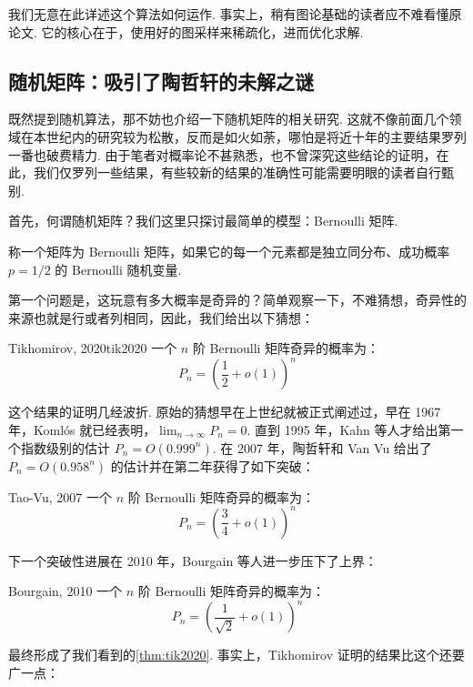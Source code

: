 我们无意在此详述这个算法如何运作. 事实上，稍有图论基础的读者应不难看懂原论文. 它的核心在于，使用好的图采样来稀疏化，进而优化求解.

\subsection{随机矩阵：吸引了陶哲轩的未解之谜}

既然提到随机算法，那不妨也介绍一下随机矩阵的相关研究. 这就不像前面几个领域在本世纪内的研究较为松散，反而是如火如荼，哪怕是将近十年的主要结果罗列一番也破费精力. 由于笔者对概率论不甚熟悉，也不曾深究这些结论的证明，在此，我们仅罗列一些结果，有些较新的结果的准确性可能需要明眼的读者自行甄别.

首先，何谓随机矩阵？我们这里只探讨最简单的模型：Bernoulli 矩阵.

\begin{definition}{}{}
    称一个矩阵为 Bernoulli 矩阵，如果它的每一个元素都是独立同分布、成功概率 $p = 1/2$ 的 Bernoulli 随机变量.
\end{definition}

第一个问题是，这玩意有多大概率是奇异的？简单观察一下，不难猜想，奇异性的来源也就是行或者列相同，因此，我们给出以下猜想：

\begin{theorem}{Tikhomirov, 2020}{tik2020}
    一个 $n$ 阶 Bernoulli 矩阵奇异的概率为：
    \[ P_n = \left( \frac{1}{2} + o(1) \right)^n \]
\end{theorem}

这个结果的证明几经波折. 原始的猜想早在上世纪就被正式阐述过，早在 1967 年，Koml\'os 就已经表明，$\displaystyle\lim_{n \to \infty} P_n = 0$. 直到 1995 年，Kahn 等人才给出第一个指数级别的估计 $P_n = O(0.999^n)$. 在 2007 年，陶哲轩和 Van Vu 给出了 $P_n = O(0.958^n)$ 的估计并在第二年获得了如下突破：

\begin{theorem}{Tao-Vu, 2007}{}
    一个 $n$ 阶 Bernoulli 矩阵奇异的概率为：
    \[ P_n = \left( \frac{3}{4} + o(1) \right)^n \]
\end{theorem}

下一个突破性进展在 2010 年，Bourgain 等人进一步压下了上界：

\begin{theorem}{Bourgain, 2010}{}
    一个 $n$ 阶 Bernoulli 矩阵奇异的概率为：
    \[ P_n = \left( \frac{1}{\sqrt{2}} + o(1) \right)^n \]
\end{theorem}

最终形成了我们看到的\autoref{thm:tik2020}. 事实上，Tikhomirov 证明的结果比这个还要广一点：

